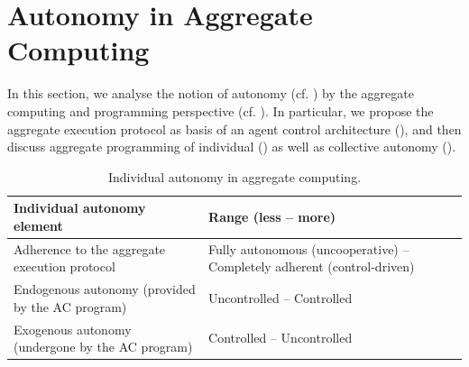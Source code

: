 \section{Autonomy in Aggregate Computing}
\label{mdpi2020:s:autonomy-ac}

In this section,
 we analyse the notion of autonomy (cf. )
 by the aggregate computing and programming perspective (cf. ).
%
In particular, we 
 propose the aggregate execution protocol 
  as basis of an agent control architecture (), and then
 discuss aggregate programming of individual ()
 as well as collective autonomy ().
 

\begin{table}
\centering
\begin{tabularx}{1\textwidth}{|p{}|p{}|} %
\hline
\textbf{Individual autonomy element} & \textbf{Range (less -- more)}
\\\hline
Adherence to the aggregate execution protocol & Fully autonomous (uncooperative) -- Completely adherent (control-driven)
\\\hline
Endogenous autonomy (provided by the AC program) & Uncontrolled -- Controlled
\\\hline
Exogenous autonomy (undergone by the AC program) & Controlled -- Uncontrolled
\\\hline
\end{tabularx} 
\caption{Individual autonomy in aggregate computing.}
\label{mdpi2020:table:summary-ac-individual-autonomy}
\end{table}

